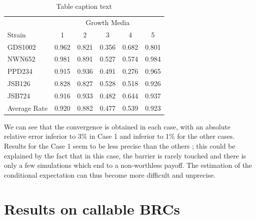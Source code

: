 \documentclass[a4paper,11pt,english]{book}
\begin{document}
\begin{table}
\centering
\begin{tabular}{l c c c c c} 
& \multicolumn{5}{c}{Growth Media} \\ 
\cmidrule(l){2-6} 
Strain & 1 & 2 & 3 & 4 & 5\\ %
\midrule %
GDS1002 & 0.962 & 0.821 & 0.356 & 0.682 & 0.801\\ %
NWN652 & 0.981 & 0.891 & 0.527 & 0.574 & 0.984\\ %
PPD234 & 0.915 & 0.936 & 0.491 & 0.276 & 0.965\\ %
JSB126 & 0.828 & 0.827 & 0.528 & 0.518 & 0.926\\ %
JSB724 & 0.916 & 0.933 & 0.482 & 0.644 & 0.937\\ %
\midrule %
\midrule %
Average Rate & 0.920 & 0.882 & 0.477 & 0.539 & 0.923\\ %
\bottomrule %
\end{tabular}
\caption{Table caption text} %
\label{tab:template} %
\end{table}

We can see that the convergence is obtained in each case, with an absolute relative error inferior to 3\% in Case 1 and inferior to 1\% for the other cases. Results for the Case 1 seem to be less precise than the others ; this could be explained by the fact that in this case, the barrier is rarely touched and there is only a few simulations which end to a non-worthless payoff. The estimation of the conditional expectation can thus become more difficult and unprecise.

\section{Results on callable BRCs}
\end{document}
